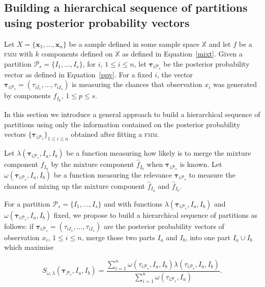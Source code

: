 \documentclass[10pt, a4paper]{article}
\newcommand{\m}[1]{\boldsymbol{#1}}
\newcommand{\fmm}{\textsc{fmm}\xspace}
\begin{document}
\begin{spacing}{1.9}
\section{Building a hierarchical sequence of partitions using posterior probability vectors}

Let $X = \{\m x_1,\dots,\m x_n \}$ be a sample defined in some sample space $\mathbb{X}$ and let $f$ be a \fmm with $k$ components defined on $\mathbb{X}$ as defined in Equation~\ref{mixt}. Given a partition $\mathcal{P}_s = \{I_1, \dots, I_s\}$, for $i$, $1\leq i \leq n $, let $\m\tau_{i \mathcal{P}_s}$ be the posterior probability vector as defined in Equation~\ref{ppv}.  For a fixed $i$, the vector $\m\tau_{i \mathcal{P}_s} =  \left( \tau_{i I_1} , \dots, \tau_{i I_s}  \right)$ is measuring the chances that observation $x_i$ was generated by components $f_{I_p}$, $1 \leq p \leq s$.

In this section we introduce a general approach to build a hierarchical sequence of partitions using only the information contained on the posterior probability vectors $\{\m\tau_{i \mathcal{P}_s}\}_{1\leq i \leq n}$ obtained after fitting a \fmm.


Let $\lambda(\m\tau_{i \mathcal{P}_s},  I_a,  I_b)$ be a function measuring how likely is to merge the mixture component $\hat{f}_{I_a}$ by the mixture component $\hat{f}_{I_b}$ when $\m \tau_{i \mathcal{P}_s}$ is known. Let $\omega(\m\tau_{i \mathcal{P}_s},  I_a,  I_b)$ be a function measuring the relevance $\m\tau_{i \mathcal{P}_s}$ to measure the chances of mixing up  the mixture component $\hat{f}_{I_a}$ and  $\hat{f}_{I_b}$. 


For a partition $\mathcal{P}_s = \{ I_1, \dots, I_s\}$ and with functions $\lambda(\m\tau_{i \mathcal{P}_s},  I_a,  I_b)$ and $\omega(\m\tau_{i \mathcal{P}_s},  I_a, I_b)$ fixed, we propose to build a hierarchical sequence of partitions as follows: if $\m\tau_{i \mathcal{P}_s} = \left( \tau_{i I_1} , \dots, \tau_{i I_s}  \right)$ are the posterior probability vectors of observation $x_i$, $1 \leq i \leq n$,  merge those two parts $I_a$ and $I_b$, into one part $I_a \cup I_b$ which maximise

\begin{equation}\label{unifying_equation}
S_{\omega, \lambda}( \m\tau_{\mathcal{P}_s},  I_a,  I_b) = \frac{\sum_{i=1}^n \omega(\tau_{i \mathcal{P}_s}, I_a, I_b) \lambda(\tau_{i \mathcal{P}_s}, I_a, I_b)}{\sum_{i=1}^n \omega(\tau_{i \mathcal{P}_s}, I_a) }.
\end{equation}


\end{spacing}
\end{document}
